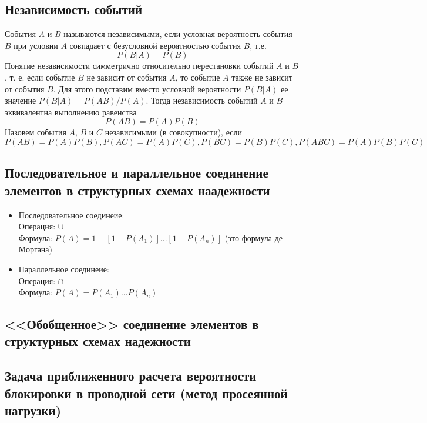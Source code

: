 \documentclass[12pt]{article}
\begin{document}
\subsection{Независимость событий}
События $A$ и $B$ называются независимыми,
если условная вероятность события $B$ при условии $A$
совпадает с безусловной вероятностью события $B$, т.е.
\[P(B|A) = P(B)\]
Понятие независимости симметрично относительно перестановки событий $A$ и $B$,
т. е. если событие $B$ не зависит от события $A$,
то событие $A$ также не зависит от события $B$.
Для этого подставим вместо условной вероятности $P(B|A)$ ее значение $P(B|A) = P(AB)/P(A)$.
Тогда независимость событий $A$ и $B$ эквивалентна выполнению равенства
\[P(AB) = P(A)P(B)\]
Назовем события $A$, $B$ и $C$ независимыми (в совокупности), если
$P(AB) = P(A)P(B), P(AC) = P(A)P(C), P(BC) = P(B)P(C), P(ABC) = P(A)P(B)P(C)$

\subsection{Последовательное и параллельное соединение элементов в структурных схемах наадежности}
\begin{itemize}
	\item Последовательное соединеие: \\
	      Операция: $\cup$ \\
	      Формула: $P(A) = 1 - [1 - P(A_1)]...[1 - P(A_n)]$ (это формула де Моргана)
	\item Параллельное соединеие: \\
	      Операция: $\cap$ \\
	      Формула: $P(A) = P(A_1)...P(A_n)$
\end{itemize}

\subsection{<<Обобщенное>> соединение элементов в структурных схемах надежности}
\subsection{Задача приближенного расчета вероятности блокировки в проводной сети (метод просеянной нагрузки)}
\end{document}

